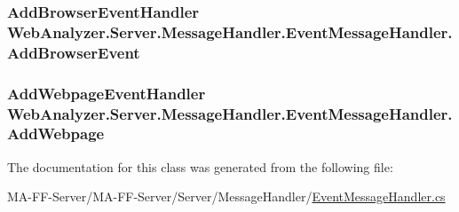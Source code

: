 \subsubsection[{Add\+Browser\+Event}]{\setlength{\rightskip}{0pt plus 5cm}Add\+Browser\+Event\+Handler Web\+Analyzer.\+Server.\+Message\+Handler.\+Event\+Message\+Handler.\+Add\+Browser\+Event}\label{class_web_analyzer_1_1_server_1_1_message_handler_1_1_event_message_handler_ab5371d9836863ebc41e4c86c9ebc348e}
\hypertarget{class_web_analyzer_1_1_server_1_1_message_handler_1_1_event_message_handler_afe82749d8d848e38bb19ddc56f9c7fe6}{}
\subsubsection[{Add\+Webpage}]{\setlength{\rightskip}{0pt plus 5cm}Add\+Webpage\+Event\+Handler Web\+Analyzer.\+Server.\+Message\+Handler.\+Event\+Message\+Handler.\+Add\+Webpage}\label{class_web_analyzer_1_1_server_1_1_message_handler_1_1_event_message_handler_afe82749d8d848e38bb19ddc56f9c7fe6}


The documentation for this class was generated from the following file\+:\begin{DoxyCompactItemize}
\item 
M\+A-\/\+F\+F-\/\+Server/\+M\+A-\/\+F\+F-\/\+Server/\+Server/\+Message\+Handler/\hyperlink{_event_message_handler_8cs}{Event\+Message\+Handler.\+cs}\end{DoxyCompactItemize}
